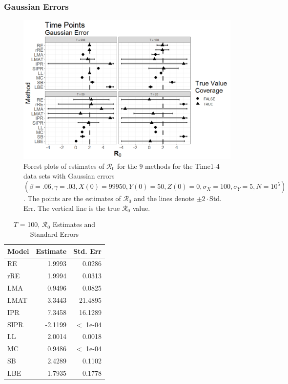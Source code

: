 \documentclass[12pt]{article}
\newcommand{\xxsir}{\ensuremath{9} } %
\newcommand{\rr}{\ensuremath{\mathcal{R}_0}}
\begin{document}
\subsubsection{Gaussian Errors}

\begin{figure}[H]
  \centering
  \includegraphics[scale=0.5]{images/time_n.tiff}
  \caption{Forest plots of estimates of $\rr$ for the \xxsir methods for the Time1-4 data sets with Gaussian errors $(\beta=.06, \gamma=.03, X(0)=99950, Y(0)=50, Z(0)=0, \sigma_X=100, \sigma_Y=5, N=10^5)$.  The points are the estimates of $\rr$ and the lines denote $\pm 2\cdot $Std. Err.  The vertical line is the true $\rr$ value.}\label{fig:time-res}
  \end{figure}


\begin{table}[H]
	

	\centering
	\begin{tabular}[t]{l|r|r}
		\hline
		Model & Estimate & Std. Err\\
		\hline
		RE & 1.9993 & 0.0286\\
		\hline
		rRE & 1.9994 & 0.0313\\
		\hline
		LMA & 0.9496 & 0.0825\\
		\hline
		LMAT & 3.3443 & 21.4895\\
		\hline
		IPR & 7.3458 & 16.1289\\
		\hline
		SIPR & -2.1199 & $<$ 1e-04\\
		\hline
		LL & 2.0014 & 0.0018\\
		\hline
		MC & 0.9486 & $<$ 1e-04\\
		\hline
		SB & 2.4289 & 0.1102\\
		\hline
		LBE & 1.7935 & 0.1778\\
		\hline
	\end{tabular}
        \caption{ $T$ = 100, $\rr$ Estimates and Standard Errors}\label{tab:time-res1}
\end{table}
\end{document}
